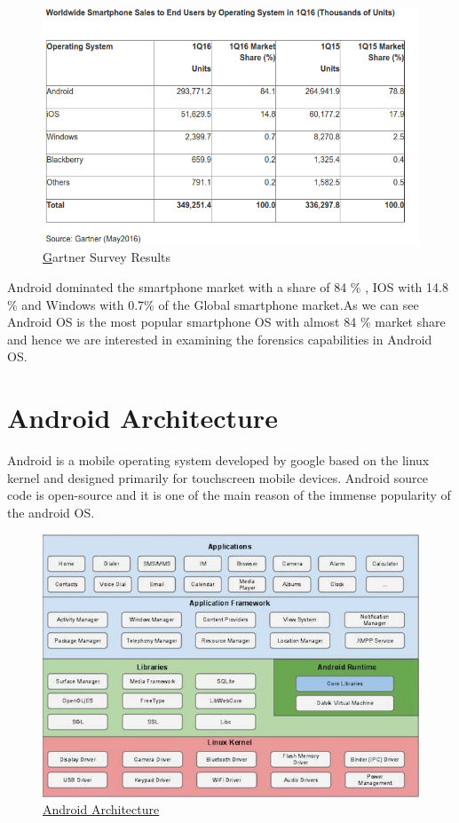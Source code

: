 \begin{figure}
   \vspace*{-1cm}
    \includegraphics[height=0.5\textheight]{fig01/gartner}
    \caption{\href{http://www.gartner.com/newsroom/id/3323017} Gartner Survey Results}
    \label{gartner}
   
    
  \end{figure}


Android dominated the smartphone market with a share of 84 \% , IOS with 14.8 \% and Windows with 0.7\% of the Global smartphone market.As we can see Android OS is the most popular smartphone OS with almost 84 \% market share and hence we  are interested in examining the forensics capabilities in Android OS. 
\goodbreak
\section{Android Architecture}
Android is a mobile operating system developed by google based on the linux kernel and designed primarily for touchscreen mobile devices. Android source code is open-source and it is one of the main reason of the immense popularity of the android OS.
\begin{figure}
   \vspace*{-1cm}
    \includegraphics[height=0.5\textheight]{fig01/architecture}
    \caption{\href{https://www.tutorialspoint.com/android/}{Android Architecture} }
    
   
    
  \end{figure}


